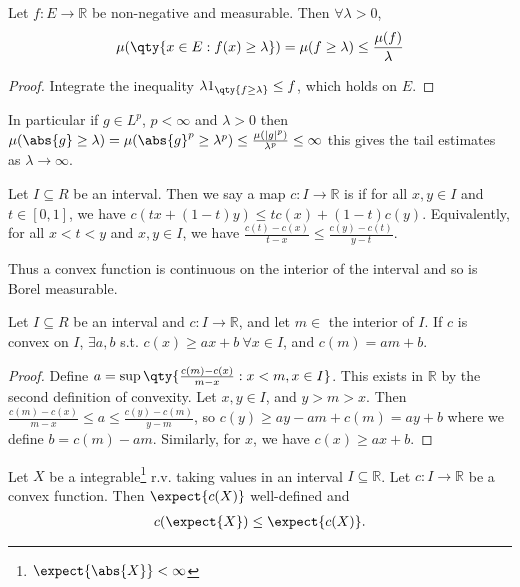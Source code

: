 \begin{proposition}
	Let $f \colon E \to \mathbb R$ be non-negative and measurable.
	Then $\forall \lambda > 0$,
	\[ \mu(\qty{x \in E : f(x) \geq \lambda}) = \mu(f \geq \lambda) \leq \frac{\mu(f)}{\lambda} \]
\end{proposition}

\begin{proof}
	Integrate the inequality $\lambda 1_{\qty{f \geq \lambda}} \leq f$, which holds on $E$.
\end{proof}

In particular if $g \in L^p$, $p < \infty$ and $\lambda > 0$ then $\mu(\abs{g} \geq \lambda) = \mu(\abs{g}^p \geq \lambda^p) \leq \frac{\mu(|g|^p)}{\lambda^p} \leq \infty$ this gives the tail estimates as $\lambda \to \infty$.

\begin{definition}
	Let $I \subseteq R$ be an interval.
	Then we say a map $c \colon I \to \mathbb R$ is  if for all $x, y \in I$ and $t \in [0,1]$, we have $c(tx + (1-t)y) \leq tc(x) + (1-t)c(y)$.
	Equivalently, for all $x < t < y$ and $x, y \in I$, we have $\frac{c(t) - c(x)}{t-x} \leq \frac{c(y) - c(t)}{y-t}$.
\end{definition}

Thus a convex function is continuous on the interior of the interval and so is Borel measurable.

\begin{lemma}
	Let $I \subseteq R$ be an interval and $c : I \to \mathbb{R}$, and let $m \in$ the interior of $I$.
	If $c$ is convex on $I$, $\exists a, b$ s.t. $c(x) \geq ax + b \ \forall x \in I$, and $c(m) = am + b$.
\end{lemma}

\begin{proof}
	Define $a = \sup \qty{\frac{c(m) - c(x)}{m - x} : x < m, x \in I}$.
	This exists in $\mathbb R$ by the second definition of convexity.
	Let $x, y \in I$, and $y > m > x$.
	Then $\frac{c(m) - c(x)}{m - x} \leq a \leq \frac{c(y) - c(m)}{y - m}$, so $c(y) \geq ay - am + c(m) = ay + b$ where we define $b = c(m) - am$.
	Similarly, for $x$, we have $c(x) \geq ax + b$.
\end{proof}

\begin{theorem}
	Let $X$ be a integrable\footnote{$\expect{\abs{X}} < \infty$} r.v. taking values in an interval $I \subseteq \mathbb R$.
	Let $c \colon I \to \mathbb R$ be a convex function.
	Then $\expect{c(X)}$ well-defined and
	\begin{align*}
		c(\expect{X}) \leq \expect{c(X)}.
	\end{align*}
\end{theorem}

